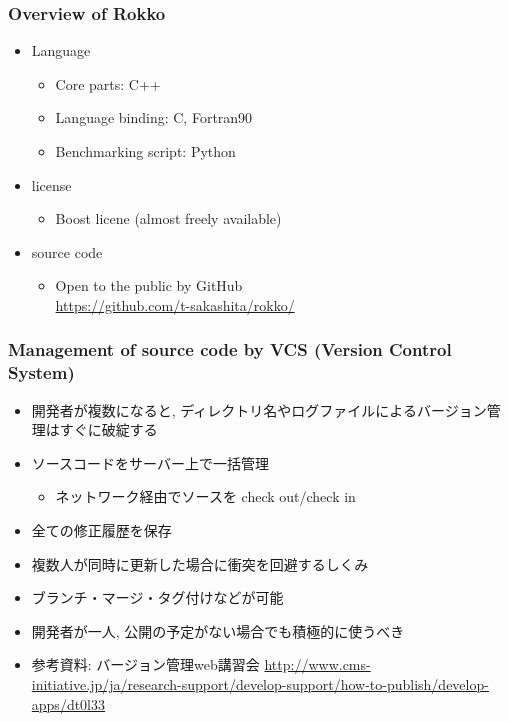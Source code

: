 \begin{frame}
  \frametitle{Overview of Rokko}
  \begin{itemize}
  \item Language
    \begin{itemize}
    \item Core parts: C++
    \item Language binding: C, Fortran90
    \item Benchmarking script: Python
    \end{itemize}
  \item license
    \begin{itemize}
    \item Boost licene (almost freely available)
    \end{itemize}
  \item source code
    \begin{itemize}
    \item Open to the public by GitHub\\
          \url{https://github.com/t-sakashita/rokko/}
    \end{itemize}
  \end{itemize}
\end{frame}

\begin{frame}
  \frametitle{Management of source code by VCS (Version Control System)}
  \begin{itemize}
  \item 開発者が複数になると, ディレクトリ名やログファイルによるバージョン管理はすぐに破綻する
  \item ソースコードをサーバー上で一括管理
    \begin{itemize}
    \item ネットワーク経由でソースを check out/check in
    \end{itemize}
  \item 全ての修正履歴を保存
  \item 複数人が同時に更新した場合に衝突を回避するしくみ
  \item ブランチ・マージ・タグ付けなどが可能
  \item 開発者が一人, 公開の予定がない場合でも積極的に使うべき
  \item 参考資料: バージョン管理web講習会 {\tiny
      \url{http://www.cms-initiative.jp/ja/research-support/develop-support/how-to-publish/develop-apps/dt0l33}}
  \end{itemize}
\end{frame}

